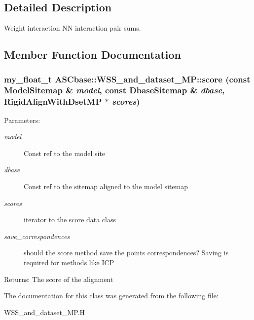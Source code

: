 \subsection{Detailed Description}
Weight interaction NN interaction pair sums. 



\subsection{Member Function Documentation}
\subsubsection{\setlength{\rightskip}{0pt plus 5cm}my\_\-float\_\-t ASCbase::WSS\_\-and\_\-dataset\_\-MP::score (const \bf{Model\-Sitemap} \& {\em model}, const \bf{Dbase\-Sitemap} \& {\em dbase}, Rigid\-Align\-With\-Dset\-MP $\ast$ {\em scores})\hspace{0.3cm}{\tt  [inline]}}\label{classASCbase_1_1WSS__and__dataset__MP_e25f013ecd47d0e5e3e367f6fa06ea5e}


\begin{Desc}
\item[Parameters:]
\begin{description}
\item[{\em model}]Const ref to the model site \item[{\em dbase}]Const ref to the sitemap aligned to the model sitemap \item[{\em scores}]iterator to the score data class \item[{\em save\_\-correspondences}]should the score method save the points correspondences? Saving is required for methods like ICP \end{description}
\end{Desc}
\begin{Desc}
\item[Returns:]The score of the alignment \end{Desc}


The documentation for this class was generated from the following file:\begin{CompactItemize}
\item 
WSS\_\-and\_\-dataset\_\-MP.H\end{CompactItemize}
